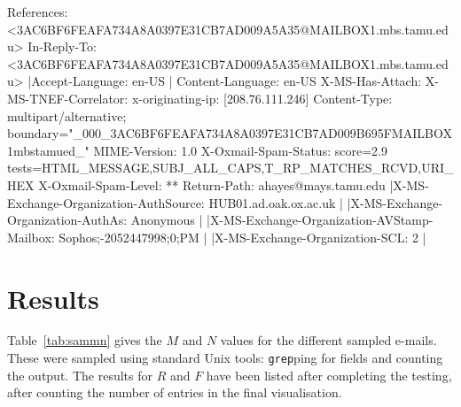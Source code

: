 \begin{example}[caption=Email \texttt{11.txt},label=eg:11]
References: <3AC6BF6FEAFA734A8A0397E31CB7AD009A5A35@MAILBOX1.mbs.tamu.edu> 
In-Reply-To: <3AC6BF6FEAFA734A8A0397E31CB7AD009A5A35@MAILBOX1.mbs.tamu.edu> 
|\colorbox{blue!30}{Accept-Language: en-US }|
Content-Language: en-US 
X-MS-Has-Attach: 
X-MS-TNEF-Correlator: 
x-originating-ip: [208.76.111.246] 
Content-Type: multipart/alternative; 
	boundary="_000_3AC6BF6FEAFA734A8A0397E31CB7AD009B695FMAILBOX1mbstamued_" 
MIME-Version: 1.0 
X-Oxmail-Spam-Status: score=2.9 tests=HTML_MESSAGE,SUBJ_ALL_CAPS,T_RP_MATCHES_RCVD,URI_HEX 
X-Oxmail-Spam-Level: ** 
Return-Path: ahayes@mays.tamu.edu 
|\colorbox{blue!30}{X-MS-Exchange-Organization-AuthSource: HUB01.ad.oak.ox.ac.uk }|
|\colorbox{blue!30}{X-MS-Exchange-Organization-AuthAs: Anonymous }|
|\colorbox{blue!30}{X-MS-Exchange-Organization-AVStamp-Mailbox: Sophos;-2052447998;0;PM }|
|\colorbox{blue!30}{X-MS-Exchange-Organization-SCL: 2 }|
\end{example}



\section{Results}

Table~\ref{tab:sammn} gives the $M$ and $N$ values for the different sampled
e-mails.  These were sampled using standard Unix tools: \texttt{grep}ping for
fields and counting the output. The results for $R$ and $F$ have been listed
after completing the testing, after counting the number of entries in the final
visualisation.

